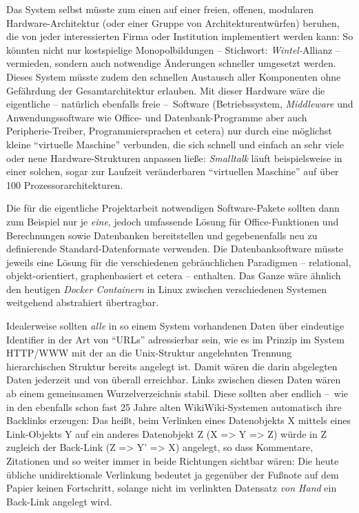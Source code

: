 \documentclass[a4paper,
fontsize=11pt,
oneside,
numbers=noperiodatend,
parskip=half-,
bibliography=totoc,
final
]{scrartcl}
\begin{document}
Das System selbst müsste zum einen auf einer freien, offenen, modularen
Hardware-Architektur (oder einer Gruppe von Architekturentwürfen)
beruhen, die von jeder interessierten Firma oder Institution
implementiert werden kann: So könnten nicht nur kostspielige
Monopolbildungen -- Stichwort: \emph{Wintel-}Allianz -- vermieden,
sondern auch notwendige Änderungen schneller umgesetzt werden. Dieses
System müsste zudem den schnellen Austausch aller Komponenten ohne
Gefährdung der Gesamtarchitektur erlauben. Mit dieser Hardware wäre die
eigentliche -- natürlich ebenfalls freie --~Software (Betriebssystem,
\emph{Middleware} und Anwendungssoftware wie Office- und
Datenbank-Programme aber auch Peripherie-Treiber, Programmiersprachen et
cetera) nur durch eine möglichst kleine \enquote{virtuelle Maschine}
verbunden, die sich schnell und einfach an sehr viele oder neue
Hardware-Strukturen anpassen ließe: \emph{Smalltalk} läuft
beispielsweise in einer solchen, sogar zur Laufzeit veränderbaren
\enquote{virtuellen Maschine} auf über 100 Prozessorarchitekturen.

Die für die eigentliche Projektarbeit notwendigen Software-Pakete
sollten dann zum Beispiel nur je \emph{eine}, jedoch umfassende Lösung
für Office-Funktionen und Berechnungen sowie Datenbanken bereitstellen
und gegebenenfalls neu zu definierende Standard-Datenformate verwenden.
Die Datenbanksoftware müsste jeweils eine Lösung für die verschiedenen
gebräuchlichen Paradigmen -- relational, objekt-orientiert,
graphenbasiert et cetera -- enthalten. Das Ganze wäre ähnlich den
heutigen \emph{Docker Containern} in Linux zwischen verschiedenen
Systemen weitgehend abstrahiert übertragbar.

Idealerweise sollten \emph{alle} in so einem System vorhandenen Daten
über eindeutige Identifier in der Art von \enquote{URLs} adressierbar
sein, wie es im Prinzip im System HTTP/WWW mit der an die Unix-Struktur
angelehnten Trennung hierarchischen Struktur bereits angelegt ist. Damit
wären die darin abgelegten Daten jederzeit und von überall erreichbar.
Links zwischen diesen Daten wären ab einem gemeinsamen Wurzelverzeichnis
stabil. Diese sollten aber endlich --~wie in den ebenfalls schon fast 25
Jahre alten WikiWiki-Systemen automatisch ihre Backlinks erzeugen: Das
heißt, beim Verlinken eines Datenobjekts X mittels eines Link-Objekts Y
auf ein anderes Datenobjekt Z (X =\textgreater{} Y =\textgreater{} Z)
würde in Z zugleich der Back-Link (Z =\textgreater{} Y' =\textgreater{}
X) angelegt, so dass Kommentare, Zitationen und so weiter immer in beide
Richtungen sichtbar wären: Die heute übliche unidirektionale Verlinkung
bedeutet ja gegenüber der Fußnote auf dem Papier keinen Fortschritt,
solange nicht im verlinkten Datensatz \emph{von Hand} ein Back-Link
angelegt wird.
\end{document}
